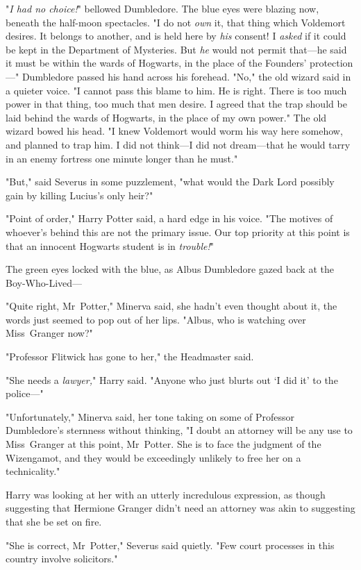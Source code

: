 "\emph{I had no choice!}" bellowed Dumbledore. The blue eyes were blazing now,
beneath the half-moon spectacles. "I do not \emph{own} it, that thing which
Voldemort desires. It belongs to another, and is held here by \emph{his}
consent! I \emph{asked} if it could be kept in the Department of Mysteries. But
\emph{he} would not permit that—he said it must be within the wards of
Hogwarts, in the place of the Founders' protection—" Dumbledore passed his
hand across his forehead. "No," the old wizard said in a quieter voice. "I
cannot pass this blame to him. He is right. There is too much power in that
thing, too much that men desire. I agreed that the trap should be laid behind
the wards of Hogwarts, in the place of my own power." The old wizard bowed his
head. "I knew Voldemort would worm his way here somehow, and planned to trap
him. I did not think—I did not dream—that he would tarry in an enemy
fortress one minute longer than he must."

"But," said Severus in some puzzlement, "what would the Dark Lord possibly gain
by killing Lucius's only heir?"

"Point of order," Harry Potter said, a hard edge in his voice. "The motives of
whoever's behind this are not the primary issue. Our top priority at this point
is that an innocent Hogwarts student is in \emph{trouble!}"

The green eyes locked with the blue, as Albus Dumbledore gazed back at the
Boy-Who-Lived—

"Quite right, Mr~Potter," Minerva said, she hadn't even thought about it, the
words just seemed to pop out of her lips. "Albus, who is watching over
Miss~Granger now?"

"Professor Flitwick has gone to her," the Headmaster said.

"She needs a \emph{lawyer,}" Harry said. "Anyone who just blurts out `I did it'
to the police—"

"Unfortunately," Minerva said, her tone taking on some of Professor
Dumbledore's sternness without thinking, "I doubt an attorney will be any use
to Miss~Granger at this point, Mr~Potter. She is to face the judgment of the
Wizengamot, and they would be exceedingly unlikely to free her on a
technicality."

Harry was looking at her with an utterly incredulous expression, as though
suggesting that Hermione Granger didn't need an attorney was akin to suggesting
that she be set on fire.

"She is correct, Mr~Potter," Severus said quietly. "Few court processes in
this country involve solicitors."

